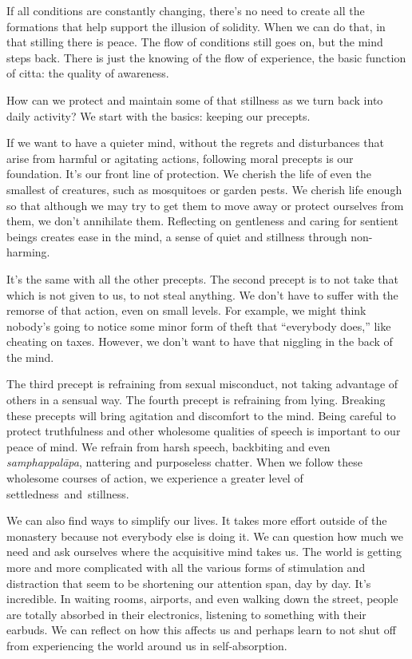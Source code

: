If all conditions are constantly changing, there's no need to create all the formations that help support the illusion of solidity. When we can do that, in that stilling there is peace. The flow of conditions still goes on, but the mind steps back. There is just the knowing of the flow of experience, the basic function of citta: the quality of awareness.

\enlargethispage{1\baselineskip}
How can we protect and maintain some of that stillness as we turn back into daily activity? We start with the basics: keeping our precepts.

If we want to have a quieter mind, without the regrets and disturbances that arise from harmful or agitating actions, following moral precepts is our foundation. It's our front line of protection. We cherish the life of even the smallest of creatures, such as mosquitoes or garden pests. We cherish life enough so that although we may try to get them to move away or protect ourselves from them, we don't annihilate them. Reflecting on gentleness and caring for sentient beings creates ease in the mind, a sense of quiet and stillness through non-harming.

It's the same with all the other precepts. The second precept is to not take that which is not given to us, to not steal anything. We don't have to suffer with the remorse of that action, even on small levels. For example, we might think nobody's going to notice some minor form of theft that ``everybody does,'' like cheating on taxes. However, we don't want to have that niggling in the back of the mind.

The third precept is refraining from sexual misconduct, not taking advantage of others in a sensual way. The fourth precept is refraining from lying. Breaking these precepts will bring agitation and discomfort to the mind. Being careful to protect truthfulness and other wholesome qualities of speech is important to our peace of mind. We refrain from harsh speech, backbiting and even \emph{samphappalāpa}, nattering and purposeless chatter. When we follow these wholesome courses of action, we experience a greater level of \mbox{settledness and stillness.}

We can also find ways to simplify our lives. It takes more effort outside of the monastery because not everybody else is doing it. We can question how much we need and ask ourselves where the acquisitive mind takes us. The world is getting more and more complicated with all the various forms of stimulation and distraction that seem to be shortening our attention span, day by day. It's incredible. In waiting rooms, airports, and even walking down the street, people are totally absorbed in their electronics, listening to something with their earbuds. We can reflect on how this affects us and perhaps learn to not shut off from experiencing the world around us in self-absorption.

